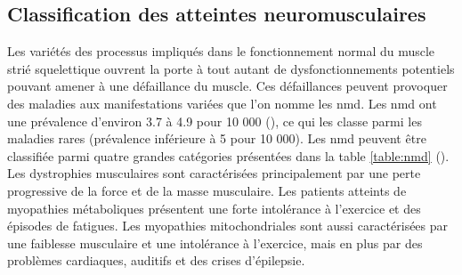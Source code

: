 \subsection{Classification des atteintes neuromusculaires}
Les variétés des processus impliqués dans le fonctionnement normal du muscle strié squelettique ouvrent la porte à tout autant de dysfonctionnements potentiels pouvant amener à une défaillance du muscle. Ces défaillances peuvent provoquer des maladies aux manifestations variées que l'on nomme les \gls{nmd}. Les \gls{nmd} ont une prévalence d'environ 3.7 à 4.9 pour 10 000 (\cite{lace_overview_2022}), ce qui les classe parmi les maladies rares (prévalence inférieure à 5 pour 10 000).  Les \gls{nmd} peuvent être classifiée parmi quatre grandes catégories présentées dans la table \ref{table:nmd} (\cite{lornage_identification_2019}). Les dystrophies musculaires sont caractérisées principalement par une perte progressive de la force et de la masse musculaire. Les patients atteints de myopathies métaboliques présentent une forte intolérance à l'exercice et des épisodes de fatigues. Les myopathies mitochondriales sont aussi caractérisées par une faiblesse musculaire et une intolérance à l'exercice, mais en plus par des problèmes cardiaques, auditifs et des crises d'épilepsie.


